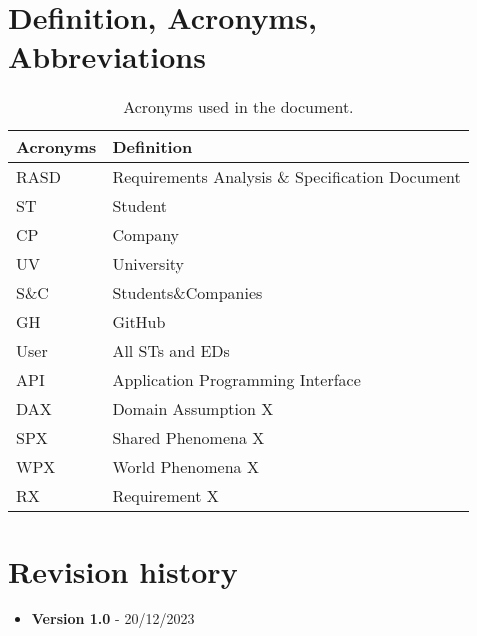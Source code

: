 \section{Definition, Acronyms, Abbreviations}
\label{sec:definition_acronyms_abbreviations}%
\begin{table}[H]
    \begin{center}
        \begin{tabular}{ |l|l| }
            \hline
            \textbf{Acronyms} & \textbf{Definition}                              \\
            \hline
            RASD             & Requirements Analysis \& Specification Document                      \\
            \hline
            ST              & Student                         \\
            \hline
            CP              & Company                         \\
            \hline
            UV             & University                    \\
            \hline
            S\&C             & Students\&Companies                   \\
            \hline
            GH              & GitHub                           \\
            \hline
            User            & All STs and EDs                           \\
            \hline
            API             & Application Programming Interface                           \\
            \hline
            DAX             & Domain Assumption X                           \\
            \hline
            SPX             & Shared Phenomena X                           \\
            \hline
            WPX             & World Phenomena X                           \\
            \hline
            RX              & Requirement X                           \\
            \hline
         \end{tabular}
        \caption{Acronyms used in the document.}
        \label{tab:acronyms}%
    \end{center}
\end{table}




\section{Revision history}
\label{sec:revision_history}%
\begin{itemize}
    \item \textbf{Version 1.0} - 20/12/2023

\end{itemize}


